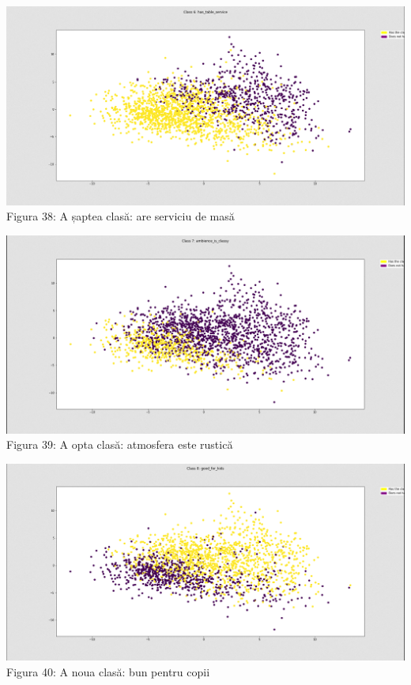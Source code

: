 \begin{center}
\includegraphics[scale=0.4]{class6} \\
Figura 38: A șaptea clasă: are serviciu de masă \\
\hfill \break

\includegraphics[scale=0.4]{class7} \\
Figura 39: A opta clasă: atmosfera este rustică \\
\hfill \break

\includegraphics[scale=0.4]{class8} \\
Figura 40: A noua clasă: bun pentru copii \\
\end{center}

